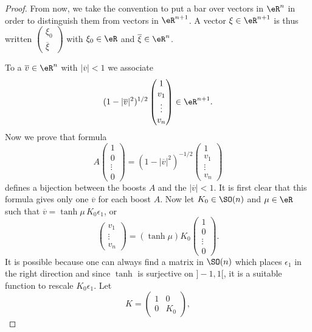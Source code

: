 \begin{proof}
From now, we take the convention to put a bar over vectors in $\eR^n$ in order to distinguish them from vectors in $\eR^{n+1}$. A vector $\xi\in\eR^{n+1}$ is thus written
$
\begin{pmatrix}
\xi_0\\\overline{ \xi }
\end{pmatrix}
$ with $\xi_0\in\eR$ and $\overline{ \xi }\in\eR^n$.

To a $\overline{ v }\in\eR^n$ with $| \overline{ v } |<1$ we associate
\[
  (1-| \overline{ v } |^2)^{1/2}
\begin{pmatrix}
1\\v_1\\\vdots\\v_n
\end{pmatrix}
\in\eR^{n+1}.
\]
Now we prove that formula
\begin{equation}
A
\begin{pmatrix}
1\\0\\\vdots\\0
\end{pmatrix}
=(1-|\overline{ v }|^2)^{-1/2}
\begin{pmatrix}
1\\v_1\\\vdots \\v_n
\end{pmatrix}
\end{equation}
defines a bijection between the boosts $A$ and the $|\overline{ v }|<1$. It is first clear that this formula gives only one $\overline{v}$ for each boost $A$. Now let $K_0\in \SO(n)$ and $\mu\in\eR$ such that $\overline{v}=\tanh\mu\,K_0\epsilon_1$, or
\[
\begin{pmatrix}
v_1\\\vdots\\v_n
\end{pmatrix}
=
(\tanh\mu)K_0
\begin{pmatrix}
1\\0\\\vdots\\0
\end{pmatrix}.
\]
It is possible because one can always find a matrix in $\SO(n)$ which places $\epsilon_1$ in the right direction and since $\tanh$ is surjective on $]-1,1[$, it is a suitable function to rescale $K_0\epsilon_1$. Let
\[
  K=
\begin{pmatrix}
1&0\\0&K_0
\end{pmatrix},
\]

\end{proof}
